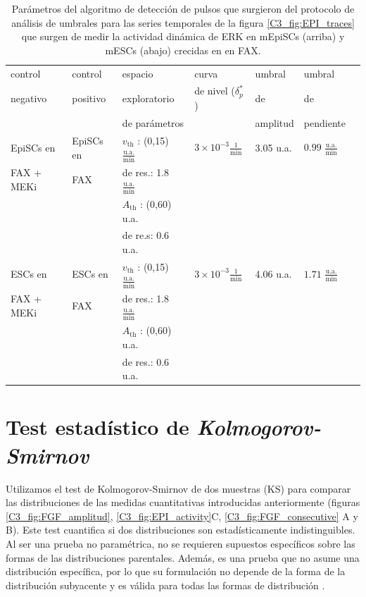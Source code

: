 \documentclass[./main.tex]{subfiles}
\begin{document}
\begin{subappendices}
\begin{table}[htbp]
\begin{adjustwidth}{-0.5in}{-0.5in}%
\centering
\begin{tabular}{|l|l|l|l|l|l|l|}
\hline
 control & control & espacio & curva & umbral & umbral \\
 negativo & positivo & exploratorio & de nivel ($\delta_p^*$) & de & de \\
 &  & de parámetros & & amplitud & pendiente \\
\hline \hline
EpiSCs en& EpiSCs en& $v_{\text{th}}$ : (0,15) $\frac{\text{u.a.}}{\text{min}}$ & $3 \times 10^{-3} \frac{1}{\text{min}}$ & 3.05 u.a. & $0.99$ $\frac{\text{u.a.}}{\text{min}}$ \\
 FAX + MEKi & FAX & de res.: 1.8 $\frac{\text{u.a.}}{\text{min}}$ & & & \\ 
  & & $A_{\text{th}}$ : (0,60) u.a. & & & \\
  & &  de re.s: 0.6 u.a. & & & \\
 \hline
 ESCs en& ESCs en& $v_{\text{th}}$ : (0,15) $\frac{\text{u.a.}}{\text{min}}$ & $3 \times 10^{-3} \frac{1}{\text{min}}$ & 4.06 u.a. & $1.71$ $\frac{\text{u.a.}}{\text{min}}$ \\
 FAX + MEKi & FAX & de res.: 1.8 $\frac{\text{u.a.}}{\text{min}}$ & & & \\
  & & $A_{\text{th}}$ : (0,60) u.a. & & & \\
  & &  de res.: 0.6 u.a. & & & \\
 \hline\end{tabular} 
 \end{adjustwidth}
\caption{Parámetros del algoritmo de detección de pulsos que surgieron del protocolo de análisis de umbrales para las series temporales de la figura \ref{C3_fig:EPI_traces} que surgen de medir la actividad dinámica de ERK en mEpiSCs (arriba) y mESCs (abajo) crecidas en en FAX.}
\label{C3_ap_tab:EPI_th}
\end{table}


\chapter{Test estadístico de \textit{Kolmogorov-Smirnov}}
\label{C3_ap:FGF_KS_test}


Utilizamos el test de Kolmogorov-Smirnov de dos muestras (KS) para comparar las distribuciones de las medidas cuantitativas introducidas anteriormente (figuras \ref{C3_fig:FGF_amplitud}, \ref{C3_fig:EPI_activity}C, \ref{C3_fig:FGF_consecutive} A y B). Este test cuantifica si dos distribuciones son estadísticamente indistinguibles. Al ser una prueba no paramétrica, no se requieren supuestos específicos sobre las formas de las distribuciones parentales. Además, es una prueba que no asume una distribución específica, por lo que su formulación no depende de la forma de la distribución subyacente y es válida para todas las formas de distribución \cite{Frodesen1979}. 



\end{subappendices}
\end{document}
